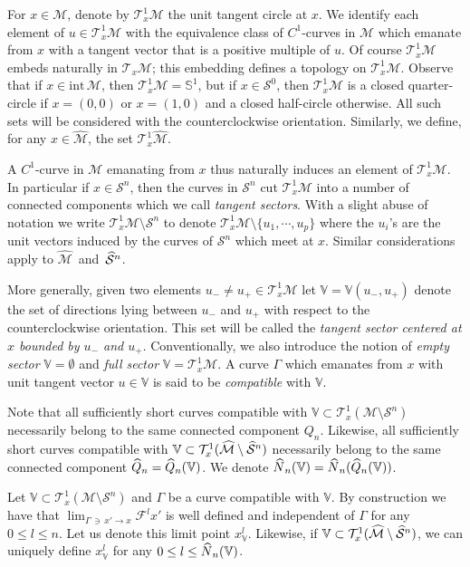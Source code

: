 \documentclass[10pt]{amsart}
\theoremstyle{definition}\newtheorem{defi}[theo]{Definition}\newtheorem{rema}[theo]{Remark}\newtheorem{exam}[theo]{Example}\newtheorem{exem}[theo]{Example}\newtheorem{nota}[theo]{Notation}
\newcommand{\intr}[1]{\mathrm{int}\,#1}
\newcommand{\hhs}{\mathbb{S}}
\newcommand{\tang}{\mathcal{T}}
\newcommand{\tangu}{\mathcal{T}^1}
\newcommand{\cm}{\mathcal{F}}
\newcommand{\csp}{\mathcal{M}}
\newcommand{\cspi}{\widehat{\csp}}
\newcommand{\singPrivate}{\mathcal{S}}
\newcommand{\sing}[1]{\singPrivate^{#1}}
\newcommand{\singp}[1]{\hat{\singPrivate}^{#1}}
\newcommand{\Np}{\hat N}
\newcommand{\cV}{\mathbb{V}}
\let\oldhat\hat
\renewcommand*{\hat}[1]{\mathchoice{\widehat{#1}}{\widehat{#1}}{\oldhat{#1}}{\oldhat{#1}}}
\begin{document}
For $x\in\csp$, denote by $\tangu_x\csp$ the unit tangent circle at $x$. We identify each element of $u\in\tangu_{x}\csp$ with the equivalence class of $C^1$-curves in $\csp$ which emanate from $x$ with a tangent vector that is a positive multiple of $u$. Of course $\tangu_x\csp$ embeds naturally in $\tang_x\csp$; this embedding defines a topology on $\tangu_x\csp$. Observe that if $x\in\intr\csp$, then $\tangu_x\csp = \hhs^1$, but if $x\in\sing0$, then $\tangu_x\csp$ is a closed quarter-circle if $x = (0,0)$ or $x = (1,0)$ and a closed half-circle otherwise. All such sets will be considered with the counterclockwise orientation. Similarly, we define, for any $x\in\cspi$, the set $\tangu_x\cspi$.

A $C^1$-curve in $\csp$ emanating from $x$ thus naturally induces an element of $\tangu_x\csp$. In particular if $x\in\sing n$, then the curves in $\sing n$ cut $\tangu_x\csp$ into a number of connected components which we call \emph{tangent sectors}. With a slight abuse of notation we write $\tangu_x\csp\setminus\sing n$ to denote $\tangu_{x}\csp\setminus\{u_1,\cdots,u_{p}\}$ where the $u_i$'s are the unit vectors induced by the curves of $\sing{n}$ which meet at $x$. Similar considerations apply to $\cspi$~and~$\singp n$.

More generally, given two elements $u_-\!\!\ne \!\!u_+\in\tangu_x\csp$ let $\cV=\cV(u_-, u_+)$ denote the set of directions lying between $u_-$ and $u_+$ with respect to the counterclockwise orientation. This set will be called the \emph{tangent sector centered at $x$ bounded by $u_-$ and $u_+$}. Conventionally, we also introduce the notion of \emph{empty sector} $\cV = \emptyset$ and \emph{full sector} $\cV = \tangu_{x}\csp$. A curve $\Gamma$ which emanates from $x$ with unit tangent vector $u\in\cV$ is said to be \emph{compatible} with $\cV$.

\noindent Note that all sufficiently short curves compatible with $\cV\subset\tangu_{x}(\csp\setminus\sing n)$ necessarily belong to the same connected component $Q_n$. Likewise, all sufficiently short curves compatible with $\cV\subset\tangu_{x}(\cspi\setminus\singp n)$ necessarily belong to the same connected component $\hat Q_n = \hat Q_n(\cV)$. We denote $\Np_n(\cV) = \Np_n(\hat Q_n(\cV))$.

Let $\cV\subset\tangu_{x}(\csp\setminus\sing n)$ and $\Gamma$ be a curve compatible with $\cV$. By construction we have that $\lim_{\Gamma\,\ni\,x'\to x}\cm^l x'$ is well defined and independent of $\Gamma$ for any $0\le l\le n$. Let us denote this limit point $x^l_\cV$. Likewise, if $\cV\subset\tangu_{x}(\cspi\setminus\singp n)$, we can uniquely define $x^{l}_{\cV}$ for any $0\le l\le \Np_n(\cV)$.
\end{document}

